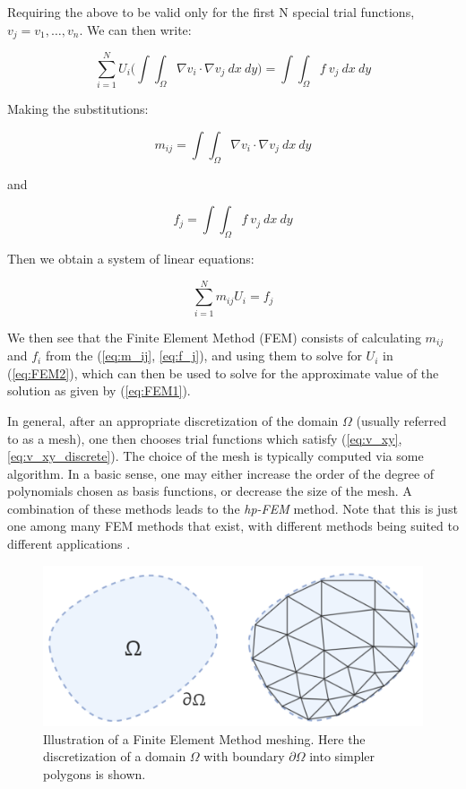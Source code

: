 \documentclass[%
 reprint,
nofootinbib,
 amsmath,amssymb,
 aps,
]{revtex4-2}
\begin{document}
Requiring the above to be valid only for the first N special trial functions, $v_j = v_1, \dots ,v_n$. We can then write:

\begin{equation}\label{eq:v_xy_discrete}
    \sum_{i = 1}^{N} U_i \bigg ( \int\int_{\Omega} \nabla v_i \cdot \nabla v_j \ dx  \ dy \bigg ) = \int \int_{\Omega} f \ v_j  \ dx  \ dy 
\end{equation} 

Making the substitutions:

\begin{equation}\label{eq:m_ij}
    m_{ij} = \int \int_{\Omega}\nabla v_i \cdot \nabla v_j \ dx  \ dy    
\end{equation} 

and

\begin{equation}\label{eq:f_j}
     f_j =  \int \int_{\Omega} f \ v_j  \ dx  \ dy 
\end{equation}

Then we obtain a system of linear equations:

\begin{equation}\label{eq:FEM2}
    \sum_{i = 1}^{N} m_{ij}U_i = f_j 
\end{equation}

We then see that the Finite Element Method (FEM) consists of calculating $m_{ij}$ and $f_i$ from the (\ref{eq:m_ij}, \ref{eq:f_j}), and using them to solve for $U_i$ in (\ref{eq:FEM2}), which can then be used to solve for the approximate value of the solution as given by (\ref{eq:FEM1}).
\newline

In general, after an appropriate discretization of the domain $\Omega$ (usually referred to as a mesh), one then chooses trial functions which satisfy (\ref{eq:v_xy}, \ref{eq:v_xy_discrete}). The choice of the mesh is typically computed via some algorithm. In a basic sense, one may either increase the order of the degree of polynomials chosen as basis functions, or decrease the size of the mesh. A combination of these methods leads to the \textit{hp-FEM} method. Note that this is just one among many FEM methods that exist, with different methods being suited to different applications \cite{Strauss_PDES}.


\begin{figure}[htb]
    \centering
    \includegraphics[width=\columnwidth]{FEM.PNG}
    \caption{Illustration of a Finite Element Method meshing. Here the discretization of a domain $\Omega$ with boundary $\partial \Omega$ into simpler polygons is shown.}
    \label{fig:FEM}
\end{figure}
\end{document}
